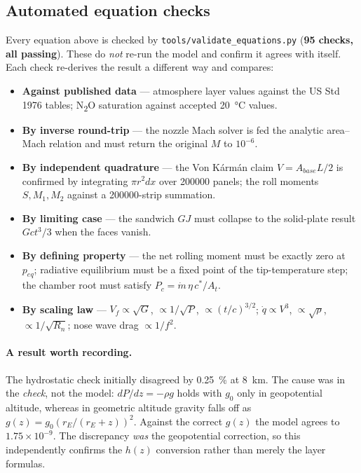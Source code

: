 \documentclass[11pt,a4paper]{article}
\begin{document}
\subsection*{Automated equation checks}

Every equation above is checked by \texttt{tools/validate\_equations.py}
(\textbf{95 checks, all passing}). These do \emph{not} re-run the model and
confirm it agrees with itself. Each check re-derives the result a different
way and compares:

\begin{itemize}[leftmargin=*,itemsep=1pt]
\item \textbf{Against published data} --- atmosphere layer values against the
      US Std 1976 tables; N\textsubscript{2}O saturation against accepted
      \SI{20}{\celsius} values.
\item \textbf{By inverse round-trip} --- the nozzle Mach solver is fed the
      analytic area--Mach relation and must return the original $M$ to
      $10^{-6}$.
\item \textbf{By independent quadrature} --- the Von K\'arm\'an claim
      $V = A_{base}L/2$ is confirmed by integrating $\pi r^2 dx$ over
      \num{200000} panels; the roll moments $S, M_1, M_2$ against a
      \num{200000}-strip summation.
\item \textbf{By limiting case} --- the sandwich $GJ$ must collapse to the
      solid-plate result $Gct^3/3$ when the faces vanish.
\item \textbf{By defining property} --- the net rolling moment must be exactly
      zero at $p_{eq}$; radiative equilibrium must be a fixed point of the
      tip-temperature step; the chamber root must satisfy
      $P_c = \dot m\,\eta\,c^*/A_t$.
\item \textbf{By scaling law} --- $V_f \propto \sqrt{G}$, $\propto 1/\sqrt{P}$,
      $\propto (t/c)^{3/2}$; $\dot q \propto V^3$, $\propto\sqrt{\rho}$,
      $\propto 1/\sqrt{R_n}$; nose wave drag $\propto 1/f^2$.
\end{itemize}

\paragraph{A result worth recording.} The hydrostatic check initially
disagreed by \SI{0.25}{\percent} at \SI{8}{km}. The cause was in the
\emph{check}, not the model: $dP/dz = -\rho g$ holds with $g_0$ only in
geopotential altitude, whereas in geometric altitude gravity falls off as
$g(z) = g_0\left(r_E/(r_E+z)\right)^2$. Against the correct $g(z)$ the model
agrees to $1.75\times10^{-9}$. The discrepancy \emph{was} the geopotential
correction, so this independently confirms the $h(z)$ conversion rather than
merely the layer formulas.
\end{document}
